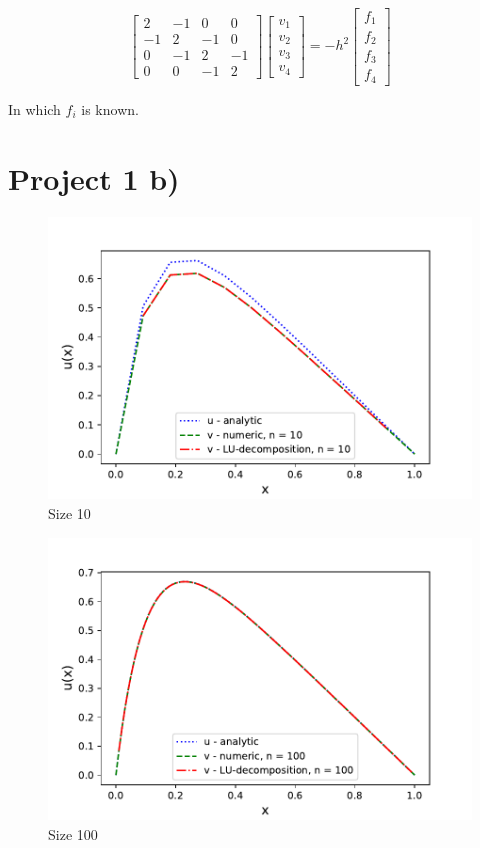 \documentclass{article}
\begin{document}
\[
\begin{bmatrix}
	2 & -1 & 0 & 0 \\
	-1 & 2 & -1 & 0 \\
	0 & -1 & 2 & -1 \\
	0 & 0 & -1 & 2
\end{bmatrix}
\begin{bmatrix}
	v_1 \\  v_2 \\ v_3 \\ v_4
\end{bmatrix}
	= -h^2
\begin{bmatrix}
	f_1 \\
	f_2 \\
	f_3 \\
	f_4
\end{bmatrix}
\]

In which $f_i$ is known. 

\section{Project 1 b)}

\begin{figure}[h]
    \centering
    \includegraphics[width =12cm]{python/size_10.pdf}
    \caption{Size 10}
    \label{fig:1}
\end{figure}

\begin{figure}[h]
    \centering
    \includegraphics[width =12cm]{python/size_100.pdf}
    \caption{Size 100}
    \label{fig:2}
\end{figure}
\end{document}
